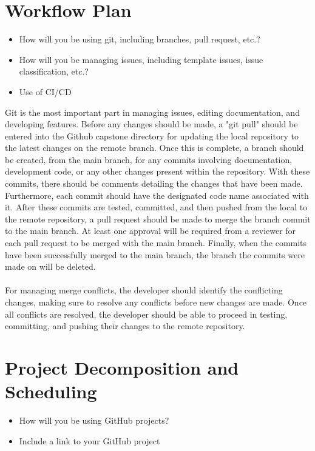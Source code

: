 \documentclass{article}
\begin{document}
\section{Workflow Plan}

\begin{itemize}
	\item How will you be using git, including branches, pull request, etc.?
	\item How will you be managing issues, including template issues, issue
	classification, etc.?
  \item Use of CI/CD
\end{itemize}

Git is the most important part in managing issues, editing documentation, and developing features.
Before any changes should be made, a "git pull" should be entered into the Github capstone directory
for updating the local repository to the latest changes on the remote branch.
Once this is complete, a branch should be created, from the main branch, for any commits involving
documentation, development code, or any other changes present within the repository.
With these commits, there should be comments detailing the changes that have been made.
Furthermore, each commit should have the designated code name associated with it.
After these commits are tested, committed, and then pushed from the local to the remote repository,
a pull request should be made to merge the branch commit to the main branch. 
At least one approval will be required from a reviewer for each pull request
to be merged with the main branch. Finally, when the commits have been successfully
merged to the main branch, the branch the commits were made on will be deleted.
\\
\\
\indent For managing merge conflicts, the developer should identify the conflicting changes,
making sure to resolve any conflicts before new changes are made. Once all conflicts
are resolved, the developer should be able to proceed in testing, committing, and pushing
their changes to the remote repository.

\section{Project Decomposition and Scheduling}

\begin{itemize}
  \item How will you be using GitHub projects?
  \item Include a link to your GitHub project
\end{itemize}
\end{document}
